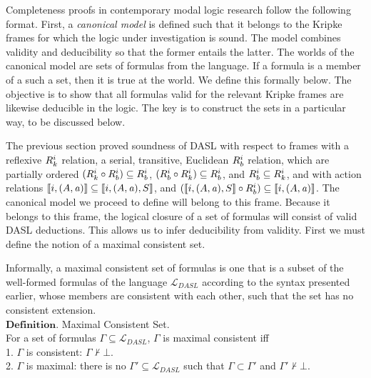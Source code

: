Completeness proofs in contemporary modal logic research follow the following format. First, a \emph{canonical model} is defined such that it belongs to the Kripke frames for which the logic under investigation is sound. The model combines validity and deducibility so that the former entails the latter. The worlds of the canonical model are sets of formulas from the language. If a formula is a member of a such a set, then it is true at the world. We define this formally below. The objective is to show that all formulas valid for the relevant Kripke frames are likewise deducible in the logic. The key is to construct the sets in a particular way, to be discussed below.

The previous section proved soundness of DASL with respect to frames with a reflexive $R_{k}^i$ relation, a serial, transitive, Euclidean $R_{b}^i$ relation, which are partially ordered $(R_{k}^i \circ R_{b}^i) \subseteq R_{b}^i$, $(R_{b}^i \circ R_{k}^i) \subseteq R_{b}^i$, and $R_{b}^i \subseteq R_{k}^i$, and with action relations  $\llbracket i,(A,\mathit{a})\rrbracket \subseteq \llbracket i,(A,\mathit{a}),S\rrbracket$, and $(\llbracket i,(A,\mathit{a}),S\rrbracket \circ R_{b}^i) \subseteq \llbracket i, (A,\mathit{a})\rrbracket$. The canonical model we proceed to define will belong to this frame. Because it belongs to this frame, the logical closure of a set of formulas will consist of valid DASL deductions. This allows us to infer deducibility from validity. First we must define the notion of a maximal consistent set.
 
Informally, a maximal consistent set of formulas is one that is a subset of the well-formed formulas of the language $\mathcal{L}_{DASL}$ according to the syntax presented earlier, whose members are consistent with each other, such that the set has no consistent extension. \\
$\mathbf{Definition}$. Maximal Consistent Set.\\
For a set of formulas $\Gamma \subseteq \mathcal{L}_{DASL}$, $\Gamma$ is maximal consistent iff\\
1. $\Gamma$ is consistent: $\Gamma \not \vdash \bot$.\\
2. $\Gamma$ is maximal: there is no $\Gamma'\subseteq\mathcal{L}_{DASL}$ such that $\Gamma \subset \Gamma'$ and $\Gamma'\not\vdash\bot$.\\

